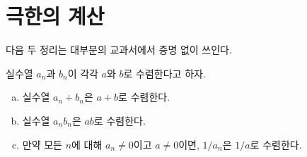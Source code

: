 \section{극한의 계산}
다음 두 정리는 대부분의 교과서에서 증명 없이 쓰인다.
\begin{theorem}
\label{thm:alglimit}
    실수열 $a_n$과 $b_n$이 각각 $a$와 $b$로 수렴한다고 하자.
    \begin{enumerate}[(a)]
        \item 실수열 $a_n + b_n$은 $a + b$로 수렴한다.
        \item 실수열 $a_n b_n$은 $ab$로 수렴한다.
        \item 만약 모든 $n$에 대해 $a_n \neq 0$이고 $a \neq 0$이면, $1/a_n$은 $1/a$로 수렴한다. 
    \end{enumerate}
\end{theorem}
